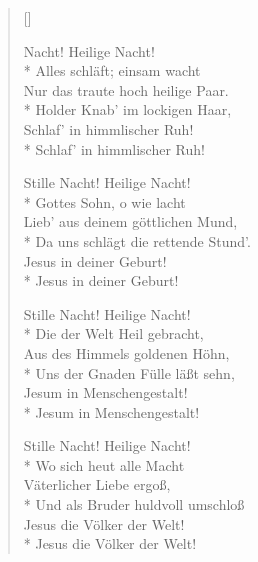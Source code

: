 \newHymn
{}


\begin{verse}[\versewidth]
\begin{patverse}
 Nacht! Heilige Nacht!\\*
Alles schläft; einsam wacht \\
Nur das traute hoch heilige Paar.\\*
Holder Knab' im lockigen Haar, \\
Schlaf' in himmlischer Ruh!\\*
Schlaf' in himmlischer Ruh!
\end{patverse}
\pointtrans

\begin{patverse}
 Stille Nacht! Heilige Nacht! \\*
Gottes Sohn, o wie lacht \\
Lieb' aus deinem göttlichen Mund,\\*
Da uns schlägt die rettende Stund'.\\ 
Jesus in deiner Geburt! \\*
Jesus in deiner Geburt! 
\end{patverse}

\begin{patverse}
 Stille Nacht! Heilige Nacht!\\*
Die der Welt Heil gebracht, \\
Aus des Himmels goldenen Höhn,\\*
Uns der Gnaden Fülle läßt sehn, \\
 Jesum in Menschengestalt! \\*
 Jesum in Menschengestalt! 
\end{patverse}

\begin{patverse}
 Stille Nacht! Heilige Nacht!\\*
Wo sich heut alle Macht \\
Väterlicher Liebe ergoß, \\*
Und als Bruder huldvoll umschloß\\
Jesus die Völker der Welt!\\*
Jesus die Völker der Welt!
\end{patverse}



\end{verse}
